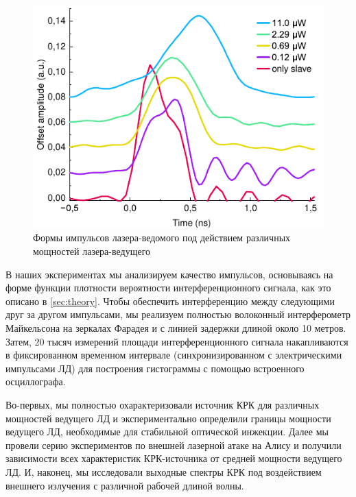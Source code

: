 \begin{figure}
	\centering
	\includegraphics[width=\linewidth]{images/envelope_att.pdf}
	\caption{Формы импульсов лазера-ведомого под действием различных мощностей лазера-ведущего}
\end{figure}
\label{fig:QKD_att}

В наших экспериментах мы анализируем качество импульсов, основываясь на форме функции плотности вероятности интерференционного сигнала, как это описано в \cref{sec:theory}. Чтобы обеспечить интерференцию между следующими друг за другом импульсами, мы реализуем полностью волоконный интерферометр Майкельсона на зеркалах Фарадея и с линией задержки длиной около 10 метров. Затем, 20 тысяч  измерений площади интерференционного сигнала накапливаются в фиксированном временном интервале (синхронизированном с электрическими импульсами ЛД) для построения гистограммы с помощью встроенного осциллографа.

Во-первых, мы полностью охарактеризовали источник КРК для различных мощностей ведущего ЛД и экспериментально определили границы мощности ведущего ЛД, необходимые для стабильной оптической инжекции. Далее мы провели серию экспериментов по внешней лазерной атаке на Алису и получили зависимости всех характеристик КРК-источника от средней мощности ведущего ЛД. И, наконец, мы исследовали выходные спектры КРК под воздействием внешнего излучения с различной рабочей длиной волны.
